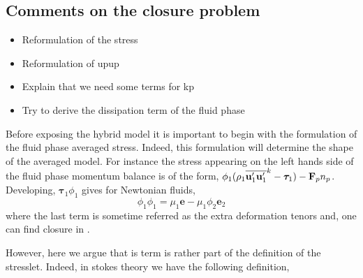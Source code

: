 \subsection{Comments on the closure problem}
\begin{itemize}
    \item Reformulation of the stress
    \item Reformulation of upup 
    \item Explain that we need some terms for kp
    \item Try to derive the dissipation term of the fluid phase
\end{itemize}
Before exposing the hybrid model it is important to begin with the formulation of the fluid phase averaged stress.
Indeed, this formulation will determine the shape of the averaged model.
For instance the stress appearing on the left hands side of the fluid phase momentum balance is of the form, 
$\phi_1 (\rho_1\overline{\textbf{u}_1'\textbf{u}_1'}^k - \bm{\tau}_1) - \textbf{F}_p n_p$. 
Developing,  $\bm{\tau}_1\phi_1$  gives for Newtonian fluids,
\begin{equation*}
    \phi_1 \phi_1
    = \mu_1 \textbf{e} - \mu_1 \phi_2 \textbf{e}_2
\end{equation*}
where the last term is sometime referred as the extra deformation tenors and, one can find closure in \citet{ishii2010thermo}. 

However, here we argue that is term is rather part of the definition of the stresslet.
Indeed, in stokes theory we have the following definition,  

